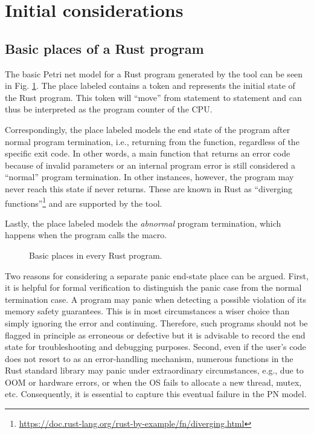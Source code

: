 \section{Initial considerations}

\subsection{Basic places of a Rust program}
\label{sec:basic-places}

The basic Petri net model for a Rust program generated by the tool
can be seen in Fig. \ref{fig:program-places}.
The place labeled  contains a token
and represents the initial state of the Rust program.
This token will ``move'' from statement to statement
and can thus be interpreted as the program counter of the \acrshort{CPU}.

Correspondingly, the place labeled  models
the end state of the program after normal program termination,
i.e., returning from the  function,
regardless of the specific exit code.
In other words, a main function that returns an error code because of invalid parameters
or an internal program error is still considered a ``normal'' program termination.
In other instances, however, the program may never reach this state
if  never returns.
These are known in Rust as ``diverging functions''\footnote{\url{https://doc.rust-lang.org/rust-by-example/fn/diverging.html}}
and are supported by the tool.

Lastly, the place labeled  models
the \emph{abnormal} program termination,
which happens when the program calls the  macro.

\begin{figure}[!htb]
  \centering
  
  \caption{Basic places in every Rust program.}
  \label{fig:program-places}
\end{figure}

Two reasons for considering a separate panic end-state place can be argued.
First, it is helpful for formal verification to distinguish the panic case
from the normal termination case.
A program may panic when detecting a possible violation of its memory safety guarantees.
This is in most circumstances a wiser choice than simply ignoring the error and continuing.
Therefore, such programs should not be flagged in principle as erroneous or defective but
it is advisable to record the end state for troubleshooting and debugging purposes.
Second, even if the user's code does not resort to 
as an error-handling mechanism, numerous functions in the Rust standard library
may panic under extraordinary circumstances, e.g., due to \acrfull{OOM} or hardware errors,
or when the \acrshort{OS} fails to allocate a new thread, mutex, etc.
Consequently, it is essential to capture this eventual failure in the \acrshort{PN} model.

